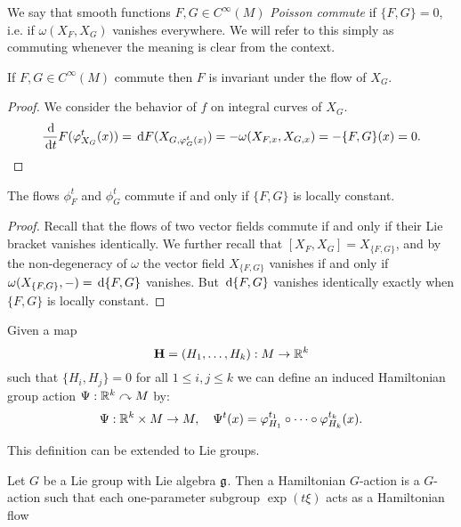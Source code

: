 \begin{dfn}
    We say that smooth functions $F,G\in C^\infty(M)$ \emph{Poisson commute} if $\{F,G\}=0$, i.e. if $\omega(X_F,X_G)$ vanishes everywhere.
    We will refer to this simply as commuting whenever the meaning is clear from the context.
\end{dfn}

\begin{lem}
    If $F,G\in C^\infty(M)$ commute then $F$ is invariant under the flow of $X_G$.
\end{lem}

\begin{proof}
    We consider the behavior of $f$ on integral curves of $X_G$.
    \[\frac{\,\mathrm d}{\,\mathrm d t}F(\varphi_{X_G}^t(x))=\,\mathrm d F(X_{G,\varphi_G^t(x)})=-\omega(X_{F,x},X_{G,x})=-\{F,G\}(x)=0.\]
\end{proof}

\begin{lem}
    The flows $\phi_F^t$ and $\phi_G^t$ commute if and only if $\{F,G\}$ is locally constant.
\end{lem}

\begin{proof}
    Recall that the flows of two vector fields commute if and only if their Lie bracket vanishes identically.
    We further recall that $[X_F,X_G]=X_{\{F,G\}}$, and by the non-degeneracy of $\omega$ the vector field $X_{\{F,G\}}$ vanishes if and only if $\omega(X_{\{F,G\}},-)=\,\mathrm d\{F,G\}$ vanishes.
    But $\,\mathrm d\{F,G\}$ vanishes identically exactly when $\{F,G\}$ is locally constant.
\end{proof}

\begin{dfn}
    Given a map 
    \[\mathbf{H}=(H_1,\ldots,H_k):M\to\mathbb{R}^k\]
    such that $\{H_i,H_j\}=0$ for all $1\le i,j\le k$ we can define an induced Hamiltonian group action $\Psi:\mathbb{R}^k\curvearrowright M$ by:
    \[\Psi:\mathbb{R}^k\times M\to M,\quad \Psi^t(x)=\varphi_{H_1}^{t_1}\circ\cdots\circ\varphi_{H_k}^{t_k}(x).\]
\end{dfn}

This definition can be extended to Lie groups.

\begin{dfn}
    Let $G$ be a Lie group with Lie algebra $\mathfrak{g}$.
    Then a Hamiltonian $G$-action is a $G$-action such that each one-parameter subgroup $\exp(t\xi)$ acts as a Hamiltonian flow 
\end{dfn}

